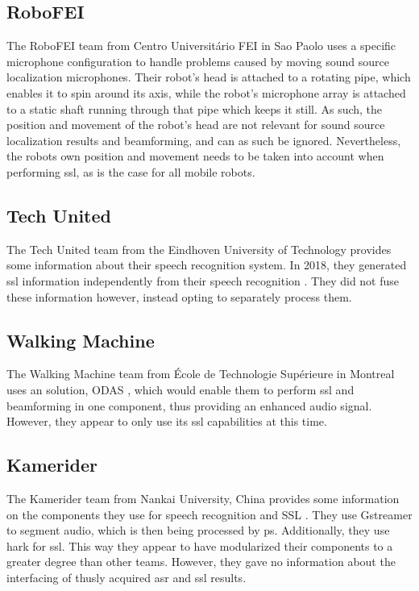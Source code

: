 \subsection{RoboFEI}
The RoboFEI team from Centro Universitário FEI in Sao Paolo \cite{robofei} uses a specific microphone configuration to handle problems caused by moving sound source localization microphones.
Their robot's head is attached to a rotating pipe, which enables it to spin around its axis, while the robot's microphone array is attached to a static shaft running through that pipe which keeps it still.
As such, the position and movement of the robot's head are not relevant for sound source localization results and beamforming, and can as such be ignored.
Nevertheless, the robots own position and movement needs to be taken into account when performing \gls{ssl}, as is the case for all mobile robots.

\subsection{Tech United}
The Tech United team from the Eindhoven University of Technology provides some information about their speech recognition system.
In 2018, they generated \gls{ssl} information independently from their speech recognition \cite{techu}.
They did not fuse these information however, instead opting to separately process them. %


\subsection{Walking Machine}
The Walking Machine team from École de Technologie Supérieure in Montreal \cite{walkingm} uses an solution, ODAS \cite{GRONDIN201963}, which would enable them to perform \gls{ssl} and beamforming in one component, thus providing an enhanced audio signal.
However, they appear to only use its \gls{ssl} capabilities at this time.


\subsection{Kamerider}
The Kamerider team from Nankai University, China provides some information on the components they use for speech recognition and SSL \cite{kamerider}.
They use Gstreamer \cite{Gstreamer} to segment audio, which is then being processed by \gls{ps}.
Additionally, they use \gls{hark} for \gls{ssl}.
This way they appear to have modularized their components to a greater degree than other teams.
However, they gave no information about the interfacing of thusly acquired \gls{asr} and \gls{ssl} results.


